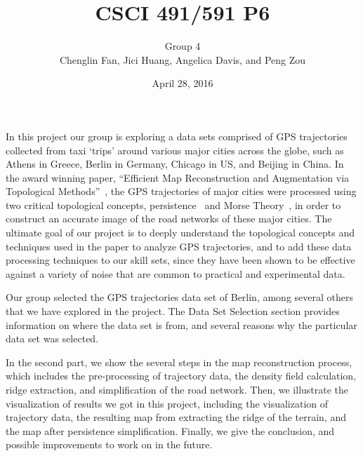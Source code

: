 \documentclass[11pt]{article}
\title{CSCI 491/591 P6}
\date{April 28, 2016}
\author{Group 4\\Chenglin Fan, Jici Huang,
Angelica Davis, and Peng Zou}
\begin{document}
\maketitle
\vspace{-0.4 in}
\noindent


  In this project our group is exploring a data sets comprised of GPS trajectories collected from taxi `trips' around various major cities across the globe, such as Athens in Greece, Berlin in Germany, Chicago in US, and Beijing in China. In the award winning paper, ``Efficient Map Reconstruction and Augmentation via Topological Methods''~\cite{Wang15}, the GPS trajectories of major cities were processed using two critical topological concepts, persistence~\cite{edelsbrunner2008persistent} and Morse Theory~\cite{milnor1963morse}, in order to construct an accurate image of the road networks of these major cities. The ultimate goal of our project is to deeply understand the topological concepts and techniques used in the paper to analyze GPS trajectories, and to add these data processing techniques to our skill sets, since they have been shown to be effective against a variety of noise that are common to  practical and experimental data.
  \par Our group selected the GPS trajectories data set of Berlin, among several others that we have explored in the project. The Data Set Selection section provides information on where the data set is from, and several reasons why the particular data set was selected. 
  
  
In the second part, we show the  several steps in the map reconstruction process, which includes the pre-processing of trajectory data, the density field calculation, ridge extraction, and  simplification of the road network.
Then, we illustrate the visualization of results we got in this project, including the  visualization of trajectory data, the resulting map from extracting the ridge of the terrain,   and the map after persistence simplification.
Finally, we give the conclusion, and possible improvements to work on in the future.
\end{document}
